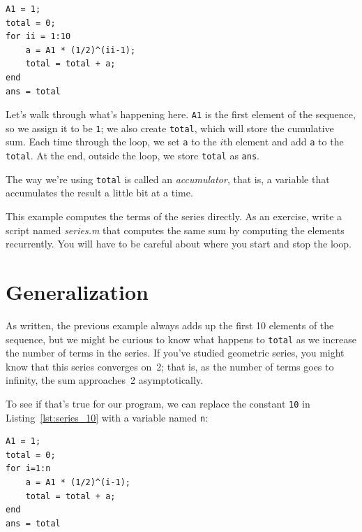 \begin{lstlisting}[caption={A program that calculates a simple series}, label={lst:series_10}]
A1 = 1;
total = 0;
for ii = 1:10
    a = A1 * (1/2)^(ii-1);
    total = total + a;
end
ans = total
\end{lstlisting}

Let's walk through what's happening here. \lstinline{A1} is the first element of the sequence, so we assign it to be \lstinline{1}; we also create \lstinline{total}, which will store the cumulative sum.
Each time through the loop, we set \lstinline{a} to the $i$th element and add \lstinline{a} to the \lstinline{total}.
At the end, outside the loop, we store  \lstinline{total} as \lstinline{ans}.

The way we're using \lstinline{total} is called an \emph{accumulator}, that is, a variable that accumulates the result a little bit at a time.



\begin{ex}
This example computes the terms of the series directly. As
an exercise, write a script named \emph{series.m} that computes
the same sum by computing the elements recurrently.  You will
have to be careful about where you start and stop the loop.
\end{ex}


\section{Generalization}


As written, the previous example always adds up the first 10
elements of the sequence, but we might be curious to know what
happens to \lstinline{total} as we increase the
number of terms in the series.  If you've studied geometric
series, you might know that this series converges on~2; that is,
as the number of terms goes to infinity, the sum approaches~2 asymptotically.

To see if that's true for our program, we can replace the
constant \lstinline{10} in Listing~\ref{lst:series_10} with a variable named \lstinline{n}:

\begin{lstlisting}[caption={Updating our code from Listing~\ref{lst:series_10} to have a variable number of terms}, label={lst:series_n}]
A1 = 1;
total = 0;
for i=1:n
    a = A1 * (1/2)^(i-1);
    total = total + a;
end
ans = total
\end{lstlisting}


